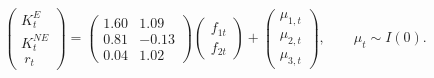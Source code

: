 \documentclass[12pt]{article}
\theoremstyle{definition}
\theoremstyle{remark}
\newcommand{\1}{\mathbf{1}}
\begin{document}
\begin{equation}
\label{eq_8}
\begin{pmatrix}
K^{E}_t \\
K^{NE}_t \\
\ r_t
\end{pmatrix}
=
\begin{pmatrix}
1.60 & 1.09 \\
0.81 & -0.13 \\
0.04 & 1.02
\end{pmatrix}
\begin{pmatrix}
f_{1t} \\
f_{2t}
\end{pmatrix}
+
\begin{pmatrix}
\mu_{1,t} \\
\mu_{2,t} \\
\mu_{3,t}
\end{pmatrix},
\qquad
\mu_t \sim I(0).
\end{equation}
\end{document}

